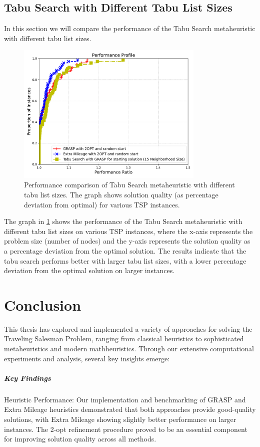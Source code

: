 \documentclass{article}
\begin{document}
\subsection{Tabu Search with Different Tabu List Sizes}
In this section we will compare the performance of the Tabu Search metaheuristic with different tabu list sizes.
\begin{figure}[!ht]
	\centering
	\includegraphics[width=0.8\textwidth]{plots/grasp_extra_tabu_2.pdf}
	\caption{Performance comparison of Tabu Search metaheuristic with different tabu list sizes. The graph shows solution quality (as percentage deviation from optimal) for various TSP instances.}
	\label{fig:tabu_search_tabu_list_sizes}
\end{figure}
The graph in \ref{fig:tabu_search_tabu_list_sizes} shows the performance of the Tabu Search metaheuristic with different tabu list sizes on various TSP instances, 
where the x-axis represents the problem size (number of nodes) and the y-axis represents the solution quality as a percentage deviation from the optimal solution.
The results indicate that the tabu search performs better with larger tabu list sizes, with a lower percentage deviation from the optimal solution on larger instances.
\newpage


\section{Conclusion}
This thesis has explored and implemented a variety of approaches for solving the Traveling Salesman Problem, ranging from classical heuristics to sophisticated metaheuristics and modern mathheuristics. Through our extensive computational experiments and analysis, several key insights emerge:

\subparagraph{Key Findings}
Heuristic Performance: Our implementation and benchmarking of GRASP and Extra Mileage heuristics demonstrated that both approaches provide good-quality solutions, with Extra Mileage showing slightly better performance on larger instances. The 2-opt refinement procedure proved to be an essential component for improving solution quality across all methods.
\end{document}
